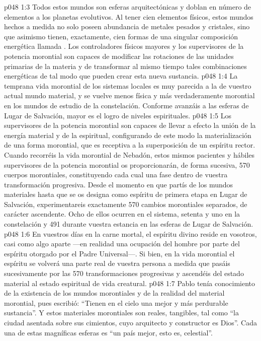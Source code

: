 \vs p048 1:3 Todos estos mundos son esferas arquitectónicas y doblan en número de elementos a los planetas evolutivos. Al tener cien elementos físicos, estos mundos hechos a medida no solo poseen abundancia de metales pesados y cristales, sino que asimismo tienen, exactamente, cien formas de una singular composición energética llamada . Los controladores físicos mayores y los supervisores de la potencia morontial son capaces de modificar las rotaciones de las unidades primarias de la materia y de transformar al mismo tiempo tales combinaciones energéticas de tal modo que pueden crear esta nueva sustancia.
\vs p048 1:4 \pc La temprana vida morontial de los sistemas locales es muy parecida a la de vuestro actual mundo material, y se vuelve menos física y más verdaderamente morontial en los mundos de estudio de la constelación. Conforme avanzáis a las esferas de Lugar de Salvación, mayor es el logro de niveles espirituales.
\vs p048 1:5 Los supervisores de la potencia morontial son capaces de llevar a efecto la unión de la energía material y de la espiritual, configurando de este modo la materialización de una forma morontial, que es receptiva a la superposición de un espíritu rector. Cuando recorréis la vida morontial de Nebadón, estos mismos pacientes y hábiles supervisores de la potencia morontial os proporcionarán, de forma sucesiva, 570 cuerpos morontiales, constituyendo cada cual una fase dentro de vuestra transformación progresiva. Desde el momento en que partís de los mundos materiales hasta que se os designa como espíritu de primera etapa en Lugar de Salvación, experimentareis exactamente 570 cambios morontiales separados, de carácter ascendente. Ocho de ellos ocurren en el sistema, setenta y uno en la constelación y 491 durante vuestra estancia en las esferas de Lugar de Salvación.
\vs p048 1:6 En vuestros días en la carne mortal, el espíritu divino reside en vosotros, casi como algo aparte ---en realidad una ocupación del hombre por parte del espíritu otorgado por el Padre Universal---. Si bien, en la vida morontial el espíritu se volverá una parte real de vuestra persona a medida que pasáis sucesivamente por las 570 transformaciones progresivas y ascendéis del estado material al estado espiritual de vida creatural.
\vs p048 1:7 \pc Pablo tenía conocimiento de la existencia de los mundos morontiales y de la realidad del material morontial, pues escribió: “Tienen en el cielo una mejor y más perdurable sustancia”. Y estos materiales morontiales son reales, tangibles, tal como “la ciudad asentada sobre sus cimientos, cuyo arquitecto y constructor es Dios”. Cada una de estas magníficas esferas es “un país mejor, esto es, celestial”.
